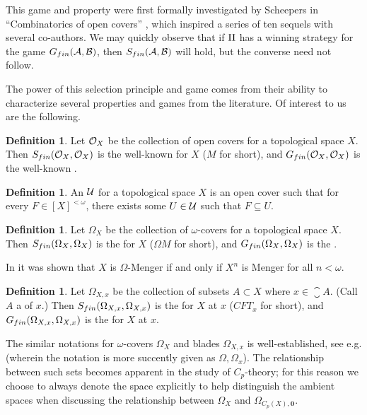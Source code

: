 \documentclass{amsart}
\renewcommand{\vec}{\mathbf}
\theoremstyle{plain}
\theoremstyle{definition}
\newtheorem{definition}[theorem]{Definition}
\theoremstyle{remark}
\theoremstyle{plain}
\theoremstyle{definition}
\theoremstyle{remark}
\begin{document}
This game and property were first formally investigated
by Scheepers in ``Combinatorics of open covers'' \cite{MR1378387}, which
inspired a series of ten sequels with several co-authors. We may quickly
observe that if \(\mathrm{II}\) has a winning strategy for the game
\(G_{fin}(\mathcal{A},\mathcal{B})\), then \(S_{fin}(\mathcal{A},\mathcal{B})\) will hold,
but the converse need not follow.

The power of this selection principle and game comes from their ability
to characterize several properties and games from the literature.
Of interest to us are the following.

\begin{definition}
  Let \(\mathcal{O}_X\) be the collection of open covers for a topological space
  \(X\). Then \(S_{fin}(\mathcal{O}_X,\mathcal{O}_X)\) is the well-known
   for \(X\) (\(M\) for short), and
  \(G_{fin}(\mathcal{O}_X,\mathcal{O}_X)\) is the
  well-known .
\end{definition}

\begin{definition}
  An  \(\mathcal{U}\)
  for a topological space \(X\) is an open cover
  such that for every \(F\in[X]^{<\omega}\), there exists some \(U\in\mathcal{U}\)
  such that \(F\subseteq U\).
\end{definition}

\begin{definition}
  Let \(\Omega_X\) be the collection of \(\omega\)-covers for a topological
  space \(X\). Then \(S_{fin}(\Omega_X,\Omega_X)\) is the
   for \(X\) (\(\Omega M\) for short), and
  \(G_{fin}(\Omega_X,\Omega_X)\) is the .
\end{definition}

In \cite[Theorem 3.9]{MR1419798} it was shown that \(X\) is \(\Omega\)-Menger
if and only if \(X^n\) is Menger for all \(n<\omega\).

\begin{definition}
  Let \(\Omega_{X,x}\) be the collection of subsets \(A\subset X\) where
  \(x\in\closure{A}\). (Call \(A\) a  of \(x\).)
  Then \(S_{fin}(\Omega_{X,x},\Omega_{X,x})\) is the
   for \(X\) at \(x\)
  (\(CFT_x\) for short), and
  \(G_{fin}(\Omega_{X,x},\Omega_{X,x})\) is the
   for \(X\) at \(x\).
\end{definition}

The similar notations for \(\omega\)-covers \(\Omega_X\) and
blades \(\Omega_{X,x}\) is well-established, see e.g.
\cite[Topological games and Ramsey theory]{19362020070101} (wherein
the notation is more succently given as \(\Omega,\Omega_x\)).  The
relationship between such sets becomes apparent in the study of
\(C_p\)-theory; for this reason we choose to always denote the space
explicitly to help distinguish the ambient spaces when discussing
the relationship between \(\Omega_X\) and
\(\Omega_{C_p(X),\vec 0}\).
\end{document}
